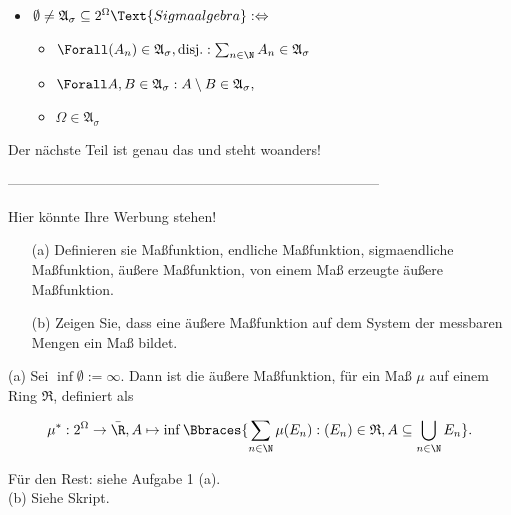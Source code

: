 \begin{solution}
\begin{itemize}
  \item $\emptyset \neq \mathfrak{A}_\sigma \subseteq 2^\Omega \Text{Sigmaalgebra} : \Leftrightarrow$
  \begin{itemize}
    \item $\Forall (A_n) \in \mathfrak{A}_\sigma, \text{disj.}: \sum_{n \in \N} A_n \in \mathfrak{A}_\sigma$
    \item $\Forall A, B \in \mathfrak{A}_\sigma: A \setminus B \in \mathfrak{A}_\sigma,$
    \item $\Omega \in \mathfrak{A}_\sigma$
  \end{itemize}

\end{itemize}

Der nächste Teil ist genau das  und steht woanders!

\end{solution}

--------------------------------------------------------------------------------

\begin{exercise}

Hier könnte Ihre Werbung stehen!

\begin{itemize}
  \item[(a)] Definieren sie Maßfunktion, endliche Maßfunktion, sigmaendliche Maßfunktion, äußere Maßfunktion, von einem Maß erzeugte äußere Maßfunktion.
  \item[(b)] Zeigen Sie, dass eine äußere Maßfunktion auf dem System der messbaren Mengen ein Maß bildet.
\end{itemize}

\end{exercise}

\begin{solution}

(a) Sei $\inf \emptyset := \infty$. Dann ist die äußere Maßfunktion, für ein Maß $\mu$ auf einem Ring $\mathfrak{R}$, definiert als

\begin{align*}
  \mu^\ast:
  2^\Omega \to \bar \R,
  A \mapsto \inf \Bbraces{\sum_{n \in \N} \mu(E_n): (E_n) \in \mathfrak{R}, A \subseteq \bigcup_{n \in \N} E_n}.
\end{align*}

Für den Rest: siehe Aufgabe 1 (a). \\

(b) Siehe Skript.

\end{solution}


